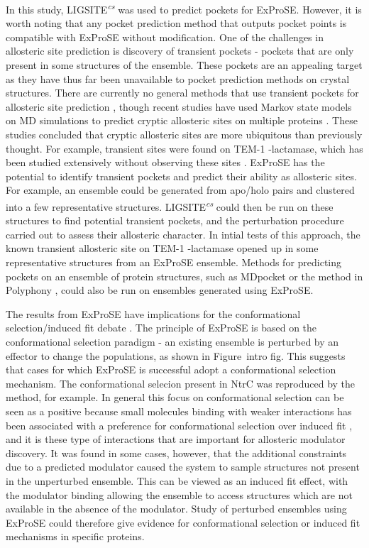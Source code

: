 In this study, LIGSITE\textsuperscript{\it cs} was used to predict pockets for ExProSE.
However, it is worth noting that any pocket prediction method that outputs pocket points is compatible with ExProSE without modification.
One of the challenges in allosteric site prediction is discovery of transient pockets - pockets that are only present in some structures of the ensemble.
These pockets are an appealing target as they have thus far been unavailable to pocket prediction methods on crystal structures.
There are currently no general methods that use transient pockets for allosteric site prediction \cite{Boehr2009}, though recent studies have used Markov state models on MD simulations to predict cryptic allosteric sites on multiple proteins \cite{Bowman2012, Bowman2015}.
These studies concluded that cryptic allosteric sites are more ubiquitous than previously thought.
For example, transient sites were found on TEM-1 \textbeta -lactamase, which has been studied extensively without observing these sites \cite{Bowman2015}.
ExProSE has the potential to identify transient pockets and predict their ability as allosteric sites.
For example, an ensemble could be generated from apo/holo pairs and clustered into a few representative structures.
LIGSITE\textsuperscript{\it cs} could then be run on these structures to find potential transient pockets, and the perturbation procedure carried out to assess their allosteric character.
In intial tests of this approach, the known transient allosteric site on TEM-1 \textbeta -lactamase opened up in some representative structures from an ExProSE ensemble.
Methods for predicting pockets on an ensemble of protein structures, such as MDpocket \cite{Schmidtke2011} or the method in Polyphony \cite{Pitt2014}, could also be run on ensembles generated using ExProSE.

The results from ExProSE have implications for the conformational selection/induced fit debate \cite{Boehr2009}.
The principle of ExProSE is based on the conformational selection paradigm - an existing ensemble is perturbed by an effector to change the populations, as shown in Figure~intro fig.
This suggests that cases for which ExProSE is successful adopt a conformational selection mechanism.
The conformational selecion present in NtrC was reproduced by the method, for example.
In general this focus on conformational selection can be seen as a positive because small molecules binding with weaker interactions has been associated with a preference for conformational selection over induced fit \cite{Okazaki2008}, and it is these type of interactions that are important for allosteric modulator discovery.
It was found in some cases, however, that the additional constraints due to a predicted modulator caused the system to sample structures not present in the unperturbed ensemble.
This can be viewed as an induced fit effect, with the modulator binding allowing the ensemble to access structures which are not available in the absence of the modulator.
Study of perturbed ensembles using ExProSE could therefore give evidence for conformational selection or induced fit mechanisms in specific proteins.

